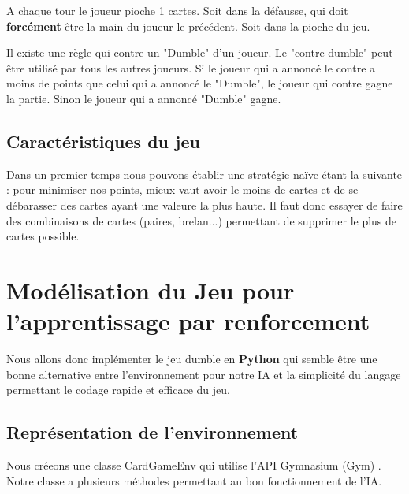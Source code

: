 \documentclass[a4paper,12pt]{article}
\begin{document}
A chaque tour le joueur pioche 1 cartes. Soit dans la défausse, qui doit \textbf{forcément} être la main du joueur le précédent. Soit dans la pioche du jeu.

Il existe une règle qui contre un "Dumble" d'un joueur. Le "contre-dumble" peut être utilisé par tous les autres joueurs. Si le joueur qui a annoncé le contre a moins de points que celui qui a annoncé le "Dumble", le joueur qui contre gagne la partie. Sinon le joueur qui a annoncé "Dumble" gagne.

\subsection{Caractéristiques du jeu}
\label{strategie_init}

Dans un premier temps nous pouvons établir une stratégie naïve étant la suivante : pour minimiser nos points, mieux vaut avoir le moins de cartes et de se débarasser des cartes ayant une valeure la plus haute. Il faut donc essayer de faire des combinaisons de cartes (paires, brelan...) permettant de supprimer le plus de cartes possible.

\section{Modélisation du Jeu pour l'apprentissage par renforcement}

Nous allons donc implémenter le jeu dumble en \textbf{Python} qui semble être une bonne alternative entre l'environnement pour notre IA et la simplicité du langage permettant le codage rapide et efficace du jeu.

\subsection{Représentation de l'environnement}

Nous créeons une classe CardGameEnv qui utilise l'API Gymnasium (Gym) \cite{GymnasiumAPI}. Notre classe a plusieurs méthodes permettant au bon fonctionnement de l'IA.
\end{document}
